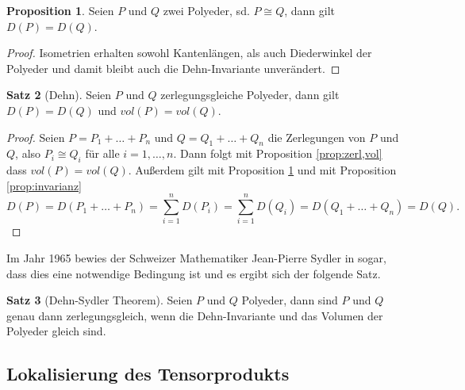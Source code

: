 \documentclass[11pt,titlepage]{article}
\theoremstyle{definition}
\newtheorem{theorem}{Satz}[section]
\newtheorem{proposition}[theorem]{Proposition}
\theoremstyle{remark}
\begin{document}
	\begin{proposition} \label{prop:cong,dehn}
		Seien $P$ und $Q$ zwei Polyeder, sd. $P\cong Q$, dann gilt $D(P)=D(Q)$.
	\end{proposition}
	
	\begin{proof}
		Isometrien erhalten sowohl Kantenlängen, als auch Diederwinkel der Polyeder und damit bleibt auch 
		die Dehn-Invariante unverändert.
	\end{proof}
	
	\begin{theorem}[Dehn] \label{thm:dehn}
		Seien $P$ und $Q$ zerlegungsgleiche Polyeder, dann gilt $D(P)=D(Q)$ und $vol(P)=vol(Q)$.
	\end{theorem}
	
	\begin{proof}
		Seien $P=P_1+\ldots+P_n$ und $Q=Q_1+\ldots+Q_n$ die Zerlegungen von $P$ und 
		$Q$, also $P_i\cong Q_i$ für alle $i=1,\ldots,n$. Dann folgt mit Proposition \ref{prop:zerl,vol}
		dass $vol(P)=vol(Q)$. Außerdem gilt mit Proposition \ref{prop:cong,dehn}
		und mit Proposition \ref{prop:invarianz}
		\[D(P)=D(P_1+\ldots+P_n)=\sum_{i=1}^n D(P_i) =\sum_{i=1}^n D(Q_i)=D(Q_1+\ldots+Q_n)=D(Q).\]
	\end{proof}
	
	Im Jahr 1965 bewies der Schweizer Mathematiker Jean-Pierre Sydler in 
	\cite{Sydler1965} 
	sogar, dass dies eine notwendige Bedingung ist und 
	es ergibt sich der folgende Satz.
	
	\begin{theorem}[Dehn-Sydler Theorem]
		Seien $P$ und $Q$ Polyeder, dann sind $P$ und $Q$ genau 
		dann zerlegungsgleich, wenn die Dehn-Invariante und das Volumen 
		der Polyeder gleich sind.
	\end{theorem}
	
	\subsection{Lokalisierung des Tensorprodukts}
	
\end{document}
